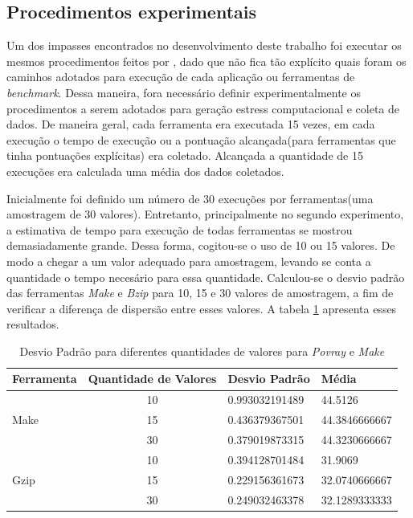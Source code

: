 \subsection{Procedimentos experimentais}
Um dos impasses encontrados no desenvolvimento deste trabalho foi executar os mesmos procedimentos feitos por , dado que não fica tão explícito quais foram os caminhos adotados para execução de cada aplicação ou ferramentas de \textit{benchmark}. Dessa maneira, fora necessário definir experimentalmente os procedimentos a serem adotados para geração estress computacional e coleta de dados. De maneira geral, cada ferramenta era executada 15 vezes, em cada execução o tempo de execução ou a pontuação alcançada(para ferramentas que tinha pontuações explícitas) era coletado. Alcançada a quantidade de 15 execuções era calculada uma média dos dados coletados.

Inicialmente foi definido um número de 30 execuções por ferramentas(uma amostragem de 30 valores). Entretanto, principalmente no segundo experimento, a estimativa de tempo para execução de todas ferramentas se mostrou demasiadamente grande. Dessa forma, cogitou-se o uso de 10 ou 15 valores. De modo a chegar a um valor adequado para amostragem, levando se conta a quantidade o tempo necesário para essa quantidade. Calculou-se o desvio padrão das ferramentas \textit{Make} e \textit{Bzip} para 10, 15 e 30 valores de amostragem, a fim de verificar a diferença de dispersão entre esses valores. A tabela \ref{desvio} apresenta esses resultados.     

\begin{table}[!h]
\centering
\caption{Desvio Padrão para diferentes quantidades de valores para \textit{Povray} e \textit{Make}}
\label{desvio}
\begin{tabular}{|l|c|l|l|}
\hline
Ferramenta            & \multicolumn{1}{l|}{Quantidade de Valores} & Desvio Padrão  & Média         \\ \hline
\multirow{3}{*}{Make} & 10                                         & 0.993032191489 & 44.5126       \\ \cline{2-4} 
                      & 15                                         & 0.436379367501 & 44.3846666667 \\ \cline{2-4} 
                      & 30                                         & 0.379019873315 & 44.3230666667 \\ \hline
\multirow{3}{*}{Gzip} & 10                                         & 0.394128701484 & 31.9069       \\ \cline{2-4} 
                      & 15                                         & 0.229156361673 & 32.0740666667 \\ \cline{2-4} 
                      & 30                                         & 0.249032463378 & 32.1289333333 \\ \hline
\end{tabular}
\end{table}

